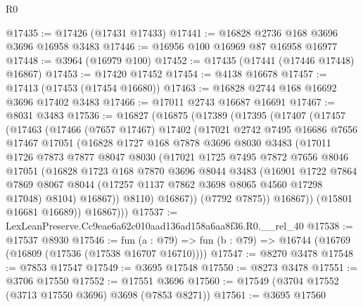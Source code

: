 \begin{lexlean}{R0}
\begin{coremodule}
@17435 := @17426 (@17431 @17433)
@17441 := @16828 @2736 @168 @3696 @3696 @16958 @3483
@17446 := @16956 @100 @16969 @87 @16958 @16977
@17448 := @3964 (@16979 @100)
@17452 := @17435 (@17441 (@17446 @17448) @16867)
@17453 := @17420 @17452
@17454 := @4138 @16678
@17457 := @17413 (@17453 (@17454 @16680))
@17463 := @16828 @2744 @168 @16692 @3696 @17402 @3483
@17466 := @17011 @2743 @16687 @16691
@17467 := @8031 @3483
@17536 := @16827
    (@16875
      (@17389
        (@17395
          (@17407
            (@17457
              (@17463
                (@17466
                  (@7657 @17467)
                  @17402
                  (@17021
                    @2742
                    @7495
                    @16686
                    @7656
                    @17467
                    @17051
                    (@16828
                      @1727
                      @168
                      @7878
                      @3696
                      @8030
                      @3483
                      (@17011
                        @1726
                        @7873
                        @7877
                        @8047
                        @8030
                        (@17021
                          @1725
                          @7495
                          @7872
                          @7656
                          @8046
                          @17051
                          (@16828
                            @1723
                            @168
                            @7870
                            @3696
                            @8044
                            @3483
                            (@16901
                              @1722
                              @7864
                              @7869
                              @8067
                              @8044
                              (@17257 @1137 @7862 @3698 @8065 @4560 @17298 @17048)
                              @8104)
                            @16867))
                        @8110)
                      @16867))
                  (@7792 @7875))
                @16867))
            (@15801 @16681 @16689))
          @16867)))
@17537 := LexLeanPreserve.Cc9eae6a62c010aad136ad158a6aa8f36.R0.__rel_40
@17538 := @17537 @8930
@17546 := fun (a : @79) => fun (b : @79) => @16744 (@16769 (@16809 (@17536 (@17538 @16707 @16710))))
@17547 := @8270 @3478
@17548 := @7853 @17547
@17549 := @3695 @17548
@17550 := @8273 @3478
@17551 := @3706 @17550
@17552 := @17551 @3696
@17560 := @17549 (@3704 @17552 (@3713 @17550 @3696) @3698 (@7853 @8271))
@17561 := @3695 @17560

\end{coremodule}
\end{lexlean}
